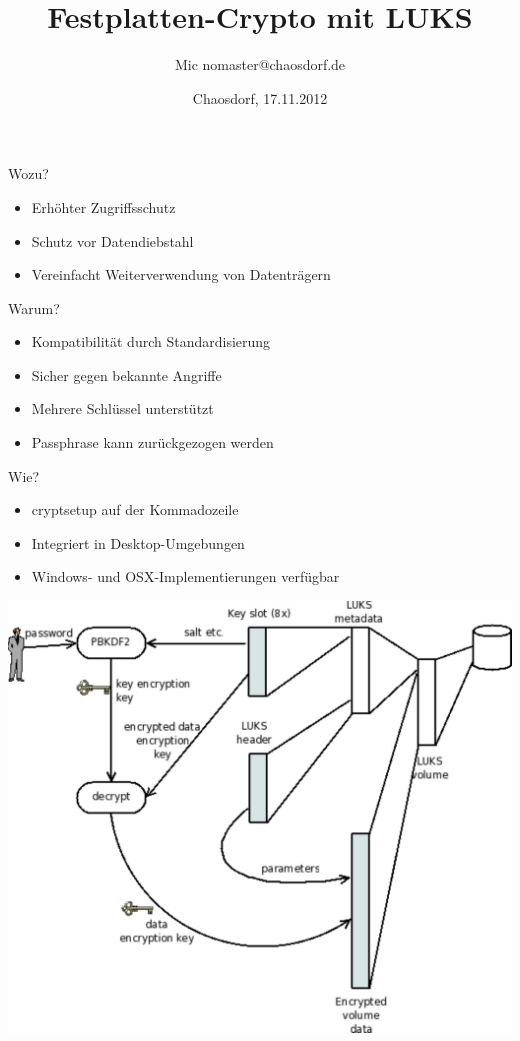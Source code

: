 \documentclass[aspectratio=1610]{beamer}
\title{Festplatten-Crypto mit LUKS}
\author[Mic]{Mic \flq nomaster@chaosdorf.de\frq}
\institute[chaosdorf]{Chaos Computer Club Düsseldorf / Chaosdorf e.V.}
\date[]{Chaosdorf, 17.11.2012}
\begin{document}
  \begin{frame}
    \titlepage
  \end{frame}

  \begin{frame}{Wozu?}
    \begin{itemize}
      \item{Erhöhter Zugriffsschutz}
      \pause
      \item{Schutz vor Datendiebstahl}
      \pause
      \item{Vereinfacht Weiterverwendung von Datenträgern}
    \end{itemize}
  \end{frame}

  \begin{frame}{Warum?}
    \begin{itemize}
      \item{Kompatibilität durch Standardisierung}
      \pause
      \item{Sicher gegen bekannte Angriffe}
      \pause
      \item{Mehrere Schlüssel unterstützt}
      \pause
      \item{Passphrase kann zurückgezogen werden}
    \end{itemize}
  \end{frame}

  \begin{frame}{Wie?}
    \begin{itemize}
      \item{cryptsetup auf der Kommadozeile}
      \pause
      \item{Integriert in Desktop-Umgebungen}
      \pause
      \item{Windows- und OSX-Implementierungen verfügbar}
    \end{itemize}
  \end{frame}

  \begin{frame}
    \includegraphics[height=\textheight]{overview.pdf}
  \end{frame}
\end{document}
